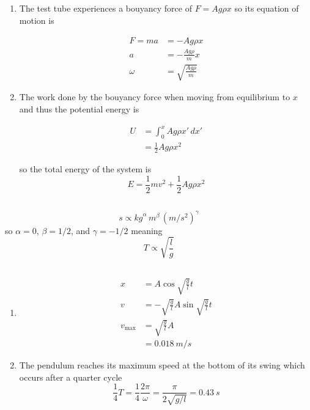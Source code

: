 \documentclass{article}
\begin{document}
\subsection{}

\begin{enumerate}
  \item The test tube experiences a bouyancy force of $F = A g \rho x$ so its equation of motion is

        \begin{align*}
          F = m a & = -A g \rho x               \\
          a       & = -\frac{A g \rho}{m} x     \\
          \omega  & = \sqrt{\frac{A g \rho}{m}}
        \end{align*}

  \item The work done by the bouyancy force when moving from equilibrium to $x$ and thus the potential energy is

        \begin{align*}
          U & = \int_0^x A g \rho x' \,dx' \\
            & = \frac{1}{2} A g \rho x^2
        \end{align*}

        so the total energy of the system is \[E = \frac{1}{2} m v^2 + \frac{1}{2} A g \rho x^2\]
\end{enumerate}

\subsection{}

\[\unit{s} \propto \unit{kg}^\alpha \, \unit{m}^\beta \, \left( \unit{m/s^2} \right)^\gamma\] so $\alpha = 0$, $\beta = 1 / 2$, and $\gamma = -1 / 2$ meaning \[T \propto \sqrt{\frac{l}{g}}\]

\subsection{}

\begin{enumerate}
  \item

        \begin{align*}
          x            & = A \cos \sqrt{\frac{g}{l}} t                     \\
          v            & = -\sqrt{\frac{g}{l}} A \sin \sqrt{\frac{g}{l}} t \\
          v_\text{max} & = \sqrt{\frac{g}{l}} A                            \\
                       & = \qty{0.018}{m/s}
        \end{align*}

  \item The pendulum reaches its maximum speed at the bottom of its swing which occurs after a quarter cycle \[\frac{1}{4} T = \frac{1}{4} \frac{2 \pi}{\omega} = \frac{\pi}{2 \sqrt{g / l}} = \qty{0.43}{s}\]
\end{enumerate}
\end{document}
